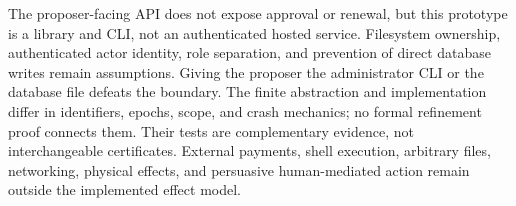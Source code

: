 The proposer-facing API does not expose approval or renewal, but this prototype is a library and CLI, not an authenticated hosted service. Filesystem ownership, authenticated actor identity, role separation, and prevention of direct database writes remain assumptions. Giving the proposer the administrator CLI or the database file defeats the boundary. The finite abstraction and implementation differ in identifiers, epochs, scope, and crash mechanics; no formal refinement proof connects them. Their tests are complementary evidence, not interchangeable certificates. External payments, shell execution, arbitrary files, networking, physical effects, and persuasive human-mediated action remain outside the implemented effect model.
